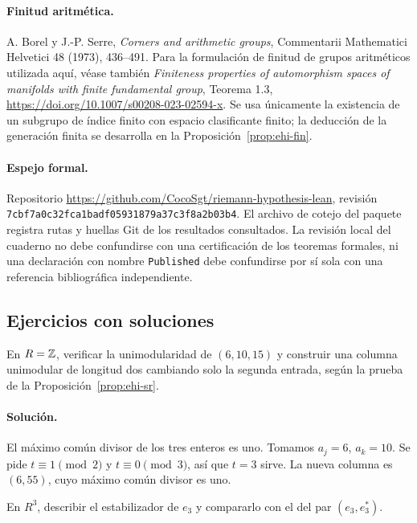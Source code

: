 \paragraph{Finitud aritmética.} A. Borel y J.-P. Serre, \emph{Corners and arithmetic groups}, Commentarii Mathematici Helvetici 48 (1973), 436--491. Para la formulación de finitud de grupos aritméticos utilizada aquí, véase también \emph{Finiteness properties of automorphism spaces of manifolds with finite fundamental group}, Teorema 1.3, \url{https://doi.org/10.1007/s00208-023-02594-x}. Se usa únicamente la existencia de un subgrupo de índice finito con espacio clasificante finito; la deducción de la generación finita se desarrolla en la Proposición~\ref{prop:ehi-fin}.

\paragraph{Espejo formal.} Repositorio \url{https://github.com/CocoSgt/riemann-hypothesis-lean}, revisión \texttt{7cbf7a0c32fca1badf05931879a37c3f8a2b03b4}. El archivo de cotejo del paquete registra rutas y huellas Git de los resultados consultados. La revisión local del cuaderno no debe confundirse con una certificación de los teoremas formales, ni una declaración con nombre \texttt{Published} debe confundirse por sí sola con una referencia bibliográfica independiente.

\subsection{Ejercicios con soluciones}

\begin{ejercicio}
En $R=\mathbb{Z}$, verificar la unimodularidad de $(6,10,15)$ y construir una columna unimodular de longitud dos cambiando solo la segunda entrada, según la prueba de la Proposición~\ref{prop:ehi-sr}.
\end{ejercicio}
\paragraph{Solución.} El máximo común divisor de los tres enteros es uno. Tomamos $a_j=6$, $a_k=10$. Se pide $t\equiv1\pmod2$ y $t\equiv0\pmod3$, así que $t=3$ sirve. La nueva columna es $(6,55)$, cuyo máximo común divisor es uno.

\begin{ejercicio}
En $R^3$, describir el estabilizador de $e_3$ y compararlo con el del par $(e_3,e_3^*)$.
\end{ejercicio}
